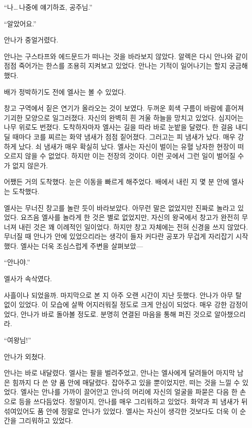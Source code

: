 ``나\ldots\,나중에 얘기하죠, 공주님.''

``알았어요.''

안나가 중얼거렸다.

안나는 구스타프와 에드문드가 떠나는 것을 바라보지 않았다. 알렉은 다시 안나와 같이  점점 죽어가는 한스를 조용히 지켜보고 있었다. 안나는 기적이 일어나기는 할지 궁금해했다.

\textbreak

배가 정박하기도 전에 엘사는 볼 수 있었다.

창고 구역에서 짙은 연기가 올라오는 것이 보였다. 두꺼운 회색 구름이 바람에 흩어져 기괴한 모양으로 일그러졌다. 자신의 완벽히 흰 겨울 하늘을 망치고 있었다. 심지어는 나무 위로도 번졌다. 도착하자마자 엘사는 길을 따라 바로 눈밭을 달렸다. 한 걸음 내디딜 때마다 코를 찌르는 화약 냄새가 점점 짙어졌다. 그러고는 피 냄새가 났다. 매우 강하게 났다. 쇠 냄새가 매우 확실히 났다. 엘사는 자신이 벌이는 유혈 낭자한 현장이 떠오르지 않을 수 없었다. 하지만 이는 전장의 것이다. 이런 곳에서 그런 일이 벌어질 수가 없지 않은가.

어쨌든 거의 도착했다. 눈은 이동을 빠르게 해주었다. 배에서 내린 지 몇 분 안에 엘사는 도착했다.

엘사는 무너진 창고를 놀란 듯이 바라보았다. 아무런 말은 없었지만 진짜로 놀라고 있었다. 요즈음 엘사를 놀라게 한 것은 별로 없었지만, 자신의 왕국에서 창고가 완전히 무너져 내린 것은 꽤 이례적인 일이었다. 하지만 창고 자체에는 전혀 신경을 쓰지 않았다. 무너질 때 안나가 안에 있었으리라는 생각이 들자 커다란 공포가 무겁게 자리잡기 시작했다. 엘사는 더욱 조심스럽게 주변을 살펴보았—

``안나야.''

엘사가 속삭였다.

사흘이나 되었을까. 마지막으로 본 지 아주 오랜 시간이 지난 듯했다. 안나가 아무 탈 없이 있었다. 이 모습에 살짝 어지러워질 정도로 크게 안심이 되었다. 매우 강한 감정이었다, 안나가 바로 돌아볼 정도로. 분명히 연결된 마음을 통해 퍼진 것으로 알아챘으리라.

``여왕님!''

안나가 외쳤다.

안나는 바로 내달렸다. 엘사는 팔을 벌려주었고, 안나는 엘사에게 달려들어 마지막 남은 힘까지 다 쓴 양 품 안에 매달렸다. 잡아주고 있을 뿐이었지만, 떠는 것을 느낄 수 있었다. 엘사는 안나를 가까이 끌어안고 안나의 머리에 자신의 얼굴을 파묻은 다음 한 손으로 등을 쓰다듬었다. 정말이지, 안나를 매우 그리워하고 있었다. 화약과 피 냄새가 뒤섞여있어도 품 안에 정말로 안나가 있었다. 엘사는 자신이 생각한 것보다도 더욱 이 순간을 그리워하고 있었다.

